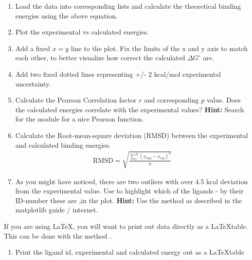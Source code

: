 \documentclass{article}
\begin{document}
\begin{enumerate}

    \item Load the data into corresponding lists and calculate the theoretical binding energies using the above equation.

    \item Plot the experimental vs calculated energies.

    \item Add a fixed $x = y$ line to the plot.
        Fix the limits of the x and y axis to match each other, to better visualize how correct the calculated $\Delta G^\circ$ are.

    \item Add two fixed dotted lines representing +/- 2 kcal/mol experimental uncertainty. 

    \item Calculate the Pearson Correlation factor $r$ and corresponding $p$ value.
        Does the calculated energies correlate with the experimental values?
        {\bf Hint:} Search for the  module for a nice Pearson function.

    \item Calculate the Root-mean-square deviation (RMSD) between the experimental and calculated binding energies.
    \begin{align}
        \mathrm{RMSD} = \sqrt{\frac{\sum_i^N (x_{\mathrm{exp}}-x_{\mathrm{cal}})^2 }{n}}
    \end{align}

    \item As you might have noticed, there are two outliers with over 4.5 kcal deviation from the experimental value.
        Use  to highlight which of the ligands - by their ID-number these are ,in the plot.
        {\bf Hint:} Use the method  as described in the matplotlib guide / internet.

\end{enumerate}


If you are using \LaTeX, you will want to print out data directly as a \LaTeX table.
This can be done with the method .


\begin{enumerate}[resume]

    \item Print the ligand id, experimental and calculated energy out as a \LaTeX table

\end{enumerate}
\end{document}
